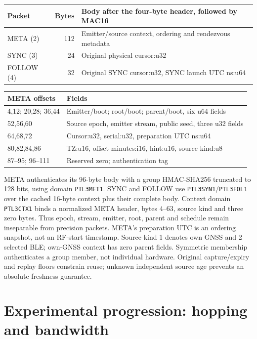 \documentclass[10pt,letterpaper]{article}
\newcommand{\code}[1]{\texttt{\small #1}}
\begin{document}
\begin{center}\small
\begin{tabular}{@{}lrp{3.35in}@{}}\toprule
Packet & Bytes & Body after the four-byte header, followed by MAC16\\\midrule
META (2) &112&Emitter/source context, ordering and rendezvous metadata\\
SYNC (3) &24&Original physical cursor:u32\\
FOLLOW (4)&32&Original SYNC cursor:u32, SYNC launch UTC ns:u64\\\bottomrule
\end{tabular}
\end{center}
\vspace{-0.3em}
\begin{center}\small
\begin{tabular}{@{}lp{4.65in}@{}}\toprule
META offsets & Fields\\\midrule
4,12; 20,28; 36,44 & Emitter/boot; root/boot; parent/boot, six u64 fields\\
52,56,60 & Source epoch, emitter stream, public seed, three u32 fields\\
64,68,72 & Cursor:u32, serial:u32, preparation UTC ns:u64\\
80,82,84,86 & TZ:u16, offset minutes:i16, hint:u16, source kind:u8\\
87--95; 96--111 & Reserved zero; authentication tag\\\bottomrule
\end{tabular}
\end{center}
META authenticates its 96-byte body with a group HMAC-SHA256 truncated to
128 bits, using domain \code{PTL3MET1}. SYNC and FOLLOW use
\code{PTL3SYN1}/\code{PTL3FOL1} over the cached 16-byte context plus their
complete body. Context domain \code{PTL3CTX1} binds a normalized META header,
bytes 4--63, source kind and three zero bytes. Thus epoch, stream, emitter,
root, parent and schedule remain inseparable from precision packets.
META's preparation UTC is an ordering snapshot, not an RF-start timestamp.
Source kind 1 denotes own GNSS and 2 selected BLE; own-GNSS context has zero
parent fields. Symmetric membership authenticates a group member, not individual hardware.
Original capture/expiry and replay floors constrain reuse; unknown independent
source age prevents an absolute freshness guarantee.
\clearpage

\section{Experimental progression: hopping and bandwidth}
\end{document}
